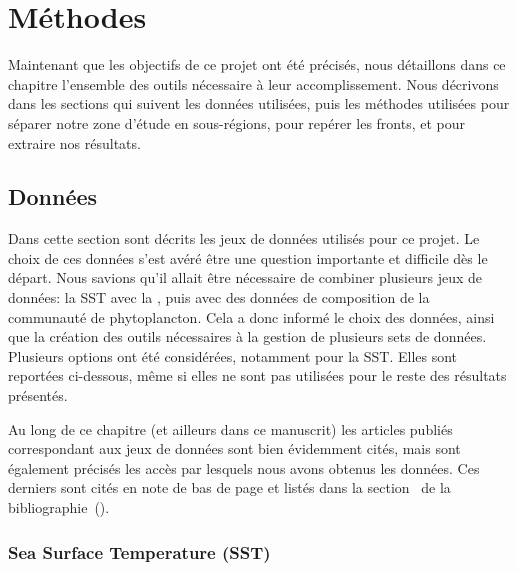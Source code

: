 
\chapter{Méthodes}
\addChpLof
\label{chp:methodes}
\graphicspath{{resources/méthodes}}

\minitoc%
\clearpage

Maintenant que les objectifs de ce projet ont été précisés, nous détaillons dans ce chapitre l'ensemble des outils nécessaire à leur accomplissement.
Nous décrivons dans les sections qui suivent les données utilisées, puis les méthodes utilisées pour séparer notre zone d'étude en sous-régions, pour repérer les fronts, et pour extraire nos résultats.

\section{Données}
\label{sec:donnees}

Dans cette section sont décrits les jeux de données utilisés pour ce projet.
Le choix de ces données s'est avéré être une question importante et difficile dès le départ.
Nous savions qu'il allait être nécessaire de combiner plusieurs jeux de données: la SST avec la , puis avec des données de composition de la communauté de phytoplancton.
Cela a donc informé le choix des données, ainsi que la création des outils nécessaires à la gestion de plusieurs sets de données.
Plusieurs options ont été considérées, notamment pour la SST.
Elles sont reportées ci-dessous, même si elles ne sont pas utilisées pour le reste des résultats présentés.

Au long de ce chapitre (et ailleurs dans ce manuscrit) les articles publiés correspondant aux jeux de données sont bien évidemment cités, mais sont également précisés les accès par lesquels nous avons obtenus les données.
Ces derniers sont cités en note de bas de page et listés dans la section~ de la bibliographie~().

\subsection{Sea Surface Temperature (SST)}
\label{sec:donnees-sst}

